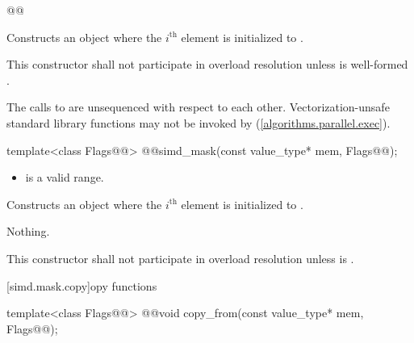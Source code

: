 \begin{wgBAdd}
\begin{itemdecl}
@@
\end{itemdecl}

\begin{itemdescr}
  \pnum\effects
  Constructs an object where the $i^\text{th}$ element is initialized to .

  \pnum\remarks
  This constructor shall not participate in overload resolution unless  is well-formed \foralli.

  \pnum
  The calls to  are unsequenced with respect to each other.
  Vectorization-unsafe standard library functions may not be invoked by  (\ref{algorithms.parallel.exec}).
\end{itemdescr}
\end{wgBAdd}

\begin{itemdecl}
template<class Flags@@> @@simd_mask(const value_type* mem, Flags@\wgAdd{ = \{\}}@);
\end{itemdecl}

\begin{itemdescr}
  \pnum\requires
  \begin{itemize}
    \item \tcode{[mem, mem + size())} is a valid range.
  \end{itemize}

  \pnum\effects
  Constructs an object where the $i^\text{th}$ element is initialized to  \foralli.

  \pnum\throws Nothing.

  \pnum\remarks
  This constructor shall not participate in overload resolution unless  is .

\end{itemdescr}

[simd.mask.copy]{\texorpdfstring{opy}{simd_mask copy} functions}

\begin{itemdecl}
template<class Flags@@> @@void copy_from(const value_type* mem, Flags@\wgAdd{ = \{\}}@);
\end{itemdecl}


